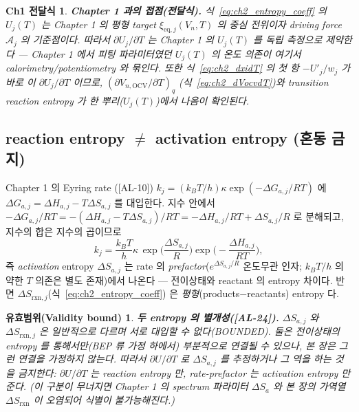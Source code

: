 \documentclass[11pt,a4paper]{article}
\newtheorem*{boundbox}{유효범위(Validity bound)}
\newtheorem*{linkbox}{Ch1 전달식}
\newcommand{\eq}{\mathrm{eq}}
\newcommand{\OCV}{\mathrm{OCV}}
\newcommand{\rxn}{\mathrm{rxn}}
\newcommand{\AL}[1]{\textsf{[AL-#1]}}
\begin{document}
\begin{linkbox}
\textbf{Chapter 1 과의 접점(전달식).} 식~\eqref{eq:ch2_entropy_coeff} 의 $U_j(T)$ 는 Chapter 1 의 평형
target $\xi_{\eq,j}(V_n,T)$ 의 \emph{중심 전위}이자 driving force $\mathcal A_j$ 의 기준점이다. 따라서
$\partial U_j/\partial T$ 는 Chapter 1 의 $U_j(T)$ 를 \emph{독립 측정으로 제약}한다 — Chapter 1 에서 피팅
파라미터였던 $U_j(T)$ 의 온도 의존이 여기서 calorimetry/potentiometry 와 묶인다. 또한 식~\eqref{eq:ch2_dxidT}
의 첫 항 $-U'_j/w_j$ 가 바로 이 $\partial U_j/\partial T$ 이므로, $(\partial V_{n,\OCV}/\partial T)_q$
(식~\eqref{eq:ch2_dVocvdT})와 transition reaction entropy 가 한 뿌리($U_j(T)$)에서 나옴이 확인된다.
\end{linkbox}

\subsection{reaction entropy $\ne$ activation entropy (혼동 금지)}\label{sec:ch2_two_entropy}
Chapter 1 의 Eyring rate \cite{eyring1935}(\AL{10}) $k_j=(k_BT/h)\kappa\exp(-\Delta G_{a,j}/RT)$ 에
$\Delta G_{a,j}=\Delta H_{a,j}-T\Delta S_{a,j}$ 를 대입한다. 지수 안에서 $-\Delta G_{a,j}/RT=
-(\Delta H_{a,j}-T\Delta S_{a,j})/RT=-\Delta H_{a,j}/RT+\Delta S_{a,j}/R$ 로 분해되고, 지수의 합은 지수의
곱이므로
\begin{equation}
k_j=\frac{k_BT}{h}\kappa\,\exp\!\Big(\frac{\Delta S_{a,j}}{R}\Big)\exp\!\Big(-\frac{\Delta H_{a,j}}{RT}\Big),
\label{eq:ch2_eyring_entropy}
\end{equation}
즉 \emph{activation} entropy $\Delta S_{a,j}$ 는 rate 의 \emph{prefactor}($e^{\Delta S_{a,j}/R}$ 온도무관 인자;
$k_BT/h$ 의 약한 $T$ 의존은 별도 존재)에서 나온다 — 전이상태와 reactant 의 entropy 차이다. 반면 $\Delta S_{\rxn,j}$(식~\eqref{eq:ch2_entropy_coeff})
은 \emph{평형}(products$-$reactants) entropy 다.
\begin{boundbox}
\textbf{두 entropy 의 별개성(\AL{24}).} $\Delta S_{a,j}$ 와 $\Delta S_{\rxn,j}$ 은 일반적으로 \emph{다르며}
서로 대입할 수 없다(BOUNDED). 둘은 전이상태의 entropy 를 통해서만(BEP 류 가정 하에서) 부분적으로 연결될 수
있으나, 본 장은 그런 연결을 \emph{가정하지 않는다}. 따라서 $\partial U/\partial T$ 로 $\Delta S_{a,j}$ 를
추정하거나 그 역을 하는 것을 금지한다: $\partial U/\partial T$ 는 reaction entropy 만, rate-prefactor 는
activation entropy 만 준다. (이 구분이 무너지면 Chapter 1 의 spectrum 파라미터 $\Delta S_a$ 와 본 장의 가역열
$\Delta S_\rxn$ 이 오염되어 식별이 불가능해진다.)
\end{boundbox}
\end{document}
